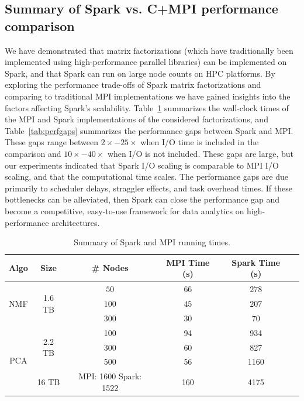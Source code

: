 \subsection{Summary of Spark vs. C+MPI performance comparison}
We have demonstrated that matrix factorizations (which have traditionally been implemented using high-performance parallel libraries) can be implemented on Spark, and that Spark can run on large node counts on HPC platforms. By exploring the performance trade-offs of Spark matrix factorizations and comparing to traditional MPI implementations we have gained insights into the factors affecting Spark's scalability. Table~\ref{tab:matrix} summarizes the wall-clock times of the MPI and Spark implementations of the considered factorizations, and Table~\ref{tab:perfgaps} summarizes the performance gaps between Spark and MPI. These gaps range between $2\times - 25\times$ when I/O time is included in the comparison and $10\times - 40\times$ when I/O is not included. These gaps are large, but our experiments indicated that Spark I/O scaling is comparable to MPI I/O scaling, and that the computational time scales. The performance gaps are due primarily to scheduler delays, straggler effects, and task overhead times. If these bottlenecks can be alleviated, then Spark can close the performance gap and become a competitive, easy-to-use framework for data analytics on high-performance architectures.

\begin{table}[tbh]
\centering

\begin{tabular}{|c|c|c|c|c|c|} \hline
Algo & Size & \# Nodes & MPI Time (s) & Spark Time (s)\\ \hline
\multirow{3}{*}{NMF} & \multirow{3}{*}{1.6 TB} & $50$ & $66$ & $278$\\
{} & {} & $100$  & $45$ & $207$\\
{} & {} & $300$ & $30$ & $70$\\ \hline
\multirow{4}{*}{PCA} & \multirow{3}{*}{2.2 TB} & 100 & 94 & 934\\
 {} & {} & 300 & 60 & 827\\
 {} & {} & 500 & 56 & 1160\\ \cline{2-5}
 {} & {16 TB} & {MPI: 1600 Spark: 1522} & 160 & 4175 \\ \hline
\end{tabular}
\caption{{Summary of Spark and MPI running times.}}
\label{tab:matrix}
\end{table}

